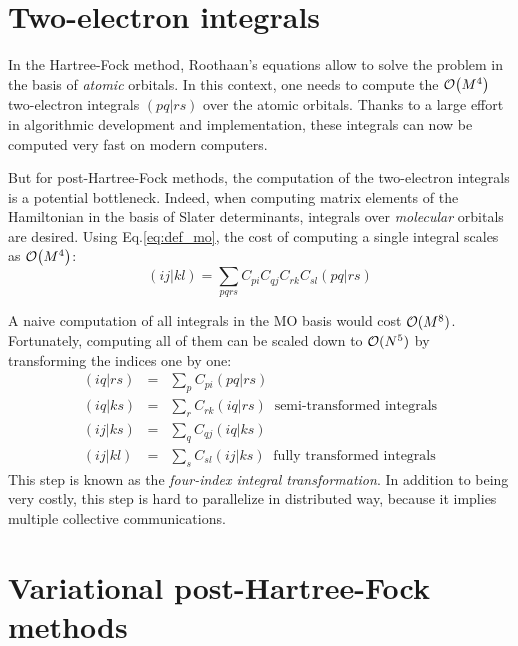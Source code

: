 \documentclass[./thesis.tex]{subfiles}
\begin{document}
\section{Two-electron integrals}

In the Hartree-Fock method, Roothaan's equations allow to solve the problem in the basis of 
\emph{atomic} orbitals.\cite{Roothaan_1951}
In this context, one needs to compute the $\order{M^4}$ two-electron integrals $(pq|rs)$ over the
atomic orbitals. Thanks to a large effort in algorithmic development and
implementation,\cite{Obara_1986,Head_Gordon_1988,Ten_no_1993,Gill_1989,Gill_1991,Libint2,Zhang_2018}
these integrals can now be computed very fast on modern computers.

But for post-Hartree-Fock methods, the computation of the two-electron
integrals is a potential bottleneck.
Indeed, when computing matrix elements of the Hamiltonian in the basis of
Slater determinants, integrals over \emph{molecular} orbitals are desired. Using
Eq.\eqref{eq:def_mo},
the cost of computing a single integral scales as $\order{M^4}$:
\begin{equation}
(ij|kl) = \sum_{pqrs} C_{pi} C_{qj} C_{rk} C_{sl} (pq|rs)
\end{equation}

A naive computation of all integrals in the MO basis would cost ${\cal O}(M^8)$. Fortunately, computing all of them can be scaled down to ${\cal O}(N^5)$ by transforming the indices one by one:\cite{Wilson_1987}
\begin{eqnarray}
(iq\vert rs) & = & \sum_{p} C_{pi} (pq|rs) \nonumber \\ 
(iq\vert ks) & = & \sum_{r} C_{rk} (iq|rs) \;\; \text{semi-transformed integrals} \\
(ij\vert ks) & = & \sum_{q} C_{qj} (iq|ks) \nonumber \\ 
(ij\vert kl) & = & \sum_{s} C_{sl} (ij|ks)  \;\; \text{fully transformed integrals}
\end{eqnarray}
This step is known as the \emph{four-index integral transformation}.  
In addition to being very costly, this step is hard to parallelize in
distributed way, because it implies multiple collective communications.\cite{Rajbhandari_2017,Limaye_1994,Fletcher_1999,Covick_1990}



\section{Variational post-Hartree-Fock methods}
\end{document}
